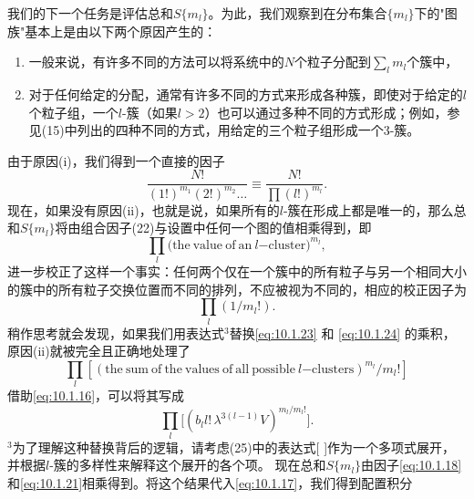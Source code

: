 我们的下一个任务是评估总和\(S\{m_l\}\)。为此，我们观察到在分布集合\(\{m_l\}\)下的"图族"基本上是由以下两个原因产生的：
\begin{enumerate}
\def\labelenumi{(\roman{enumi})}
\item
  一般来说，有许多不同的方法可以将系统中的\(N\)个粒子分配到\(\sum_{l} m_{l}\)个簇中，
\item
  对于任何给定的分配，通常有许多不同的方式来形成各种簇，即使对于给定的\(l\)个粒子组，一个\(l\)-簇（如果\(l > 2\)）也可以通过多种不同的方式形成；例如，参见(15)中列出的四种不同的方式，用给定的三个粒子组形成一个3-簇。
\end{enumerate}
由于原因(i)，我们得到一个直接的因子
\begin{equation}\tag{10.1.18}\label{eq:10.1.18}
\frac { N ! } { ( 1 ! ) ^{m _ { 1} } ( 2 ! ) ^{m _ { 2} } \ldots } \equiv \frac { N ! } { \prod ( l ! ) ^{m _ { l} } } .
\end{equation}
现在，如果没有原因(ii)，也就是说，如果所有的\(l\)-簇在形成上都是唯一的，那么总和\(S\{m_l\}\)将由组合因子(22)与设置中任何一个图的值相乘得到，即
\begin{equation}\tag{10.1.19}\label{eq:10.1.19}
\prod _ { l } \mathrm { ( t h e ~ v a l u e ~ o f ~ a n ~ } l \mathrm { - c l u s t e r } ) ^{m _ { l} } ,
\end{equation}
进一步校正了这样一个事实：任何两个仅在一个簇中的所有粒子与另一个相同大小的簇中的所有粒子交换位置而不同的排列，不应被视为不同的，相应的校正因子为
\begin{equation}\tag{10.1.20}\label{eq:10.1.20}
\prod _ { l } ( 1 / m _ { l } ! ) .
\end{equation}
稍作思考就会发现，如果我们用表达式\(^{3}\)替换\autoref{eq:10.1.23} 和 \autoref{eq:10.1.24} 的乘积，原因(ii)就被完全且正确地处理了
\begin{equation}\tag{10.1.21}\label{eq:10.1.21}
\prod _ { l } [ ( \mathrm { t h e ~ s u m ~ o f ~ t h e ~ v a l u e s ~ o f ~ a l l ~ p o s s i b l e ~ } l { \mathrm { - c l u s t e r s } } ) ^{m _ { l} } / m _ { l } ! ]
\end{equation}
借助\autoref{eq:10.1.16}，可以将其写成
\begin{equation}\tag{10.1.22}\label{eq:10.1.22}
\prod _ { l } \Big [ ( b _ { l } l ! \, \lambda ^{3 ( l - 1 )} V ) ^{m _ { l} / m _ { l } ! } \Big ] .
\end{equation}
\(^{3}\)为了理解这种替换背后的逻辑，请考虑(25)中的表达式{[} {]}作为一个多项式展开，并根据\(l\)-簇的多样性来解释这个展开的各个项。
现在总和\(S\{m_{l}\}\)由因子\autoref{eq:10.1.18}和\autoref{eq:10.1.21}相乘得到。将这个结果代入\autoref{eq:10.1.17}，我们得到配置积分
